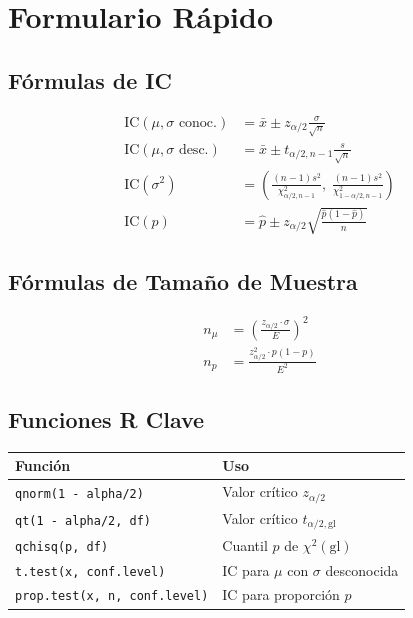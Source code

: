 \documentclass[11pt, a4paper]{article}
\begin{document}
\section{Formulario R\'apido}

\subsection{F\'ormulas de IC}

\begin{align}
\text{IC}(\mu, \sigma \text{ conoc.}) &= \bar{x} \pm z_{\alpha/2} \frac{\sigma}{\sqrt{n}} \tag{1} \\[6pt]
\text{IC}(\mu, \sigma \text{ desc.}) &= \bar{x} \pm t_{\alpha/2,n-1} \frac{s}{\sqrt{n}} \tag{2} \\[6pt]
\text{IC}(\sigma^2) &= \left(\frac{(n-1)s^2}{\chi^2_{\alpha/2,n-1}},\; \frac{(n-1)s^2}{\chi^2_{1-\alpha/2,n-1}}\right) \tag{3} \\[6pt]
\text{IC}(p) &= \hat{p} \pm z_{\alpha/2} \sqrt{\frac{\hat{p}(1-\hat{p})}{n}} \tag{4}
\end{align}

\subsection{F\'ormulas de Tama\~no de Muestra}

\begin{align}
n_{\mu} &= \left(\frac{z_{\alpha/2} \cdot \sigma}{E}\right)^2 \tag{5} \\[6pt]
n_{p} &= \frac{z_{\alpha/2}^2 \cdot p(1-p)}{E^2} \tag{6}
\end{align}

\subsection{Funciones R Clave}

\begin{center}
\begin{tabular}{ll}
\toprule
\textbf{Funci\'on} & \textbf{Uso} \\
\midrule
\texttt{qnorm(1 - alpha/2)} & Valor cr\'itico $z_{\alpha/2}$ \\
\texttt{qt(1 - alpha/2, df)} & Valor cr\'itico $t_{\alpha/2, \text{gl}}$ \\
\texttt{qchisq(p, df)} & Cuantil $p$ de $\chi^2(\text{gl})$ \\
\texttt{t.test(x, conf.level)} & IC para $\mu$ con $\sigma$ desconocida \\
\texttt{prop.test(x, n, conf.level)} & IC para proporci\'on $p$ \\
\bottomrule
\end{tabular}
\end{center}
\end{document}
